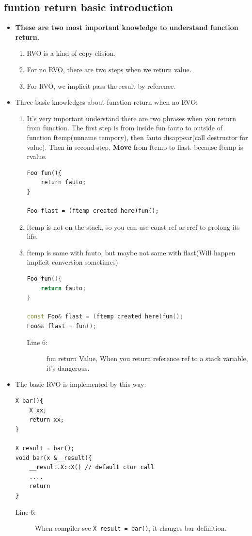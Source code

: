 \documentclass[a4paper,11pt,twoside]{book}
\begin{document}
\subsection{funtion return basic introduction}
\begin{itemize}
	\item \textbf{These are two most important knowledge to understand function return.}
	\begin{enumerate}
		\item RVO is a kind of copy elision.
		\item For no RVO, there are two steps when we return value.
		\item For RVO, we implicit pass the result by reference.
	\end{enumerate}
	
	\item Three basic knowledges about function return when no RVO:
	\begin{enumerate}
		\item It's very important understand there are two phrases when you return from function. The first step  is from inside fun fauto to outside of function ftemp(unname tempory), then fauto disappear(call destructor for value).  Then in second step, \textbf{Move} from ftemp to flast. because ftemp is rvalue.
\begin{lstlisting}[numbers=none]
Foo fun(){
	return fauto;
}
		
Foo flast = (ftemp created here)fun();
\end{lstlisting}
		\item ftemp is not on the stack, so you can use const ref or rref to prolong its life.
		
		\item ftemp is same with fauto, but maybe not same with flast(Will happen implicit conversion sometimes)
\begin{lstlisting}[frame=single, language=c++]
Foo fun(){
	return fauto;
}
		
const Foo& flast = (ftemp created here)fun();
Foo&& flast = fun();
\end{lstlisting}
\begin{description}
	\item[Line 6:] fun return Value, When you return reference ref to a stack variable, it's dangerous.
\end{description}

	\end{enumerate}
	
	\item The basic RVO is implemented by this way:
\begin{lstlisting}
X bar(){
	X xx;
	return xx;
}
	
X result = bar();
void bar(x &__result){
	__result.X::X() // default ctor call
	....
	return
}
\end{lstlisting}
\begin{description}
	\item[Line 6:] When compiler see \texttt{X result = bar()}, it changes bar definition.  
\end{description}
\end{itemize}
\end{document}

